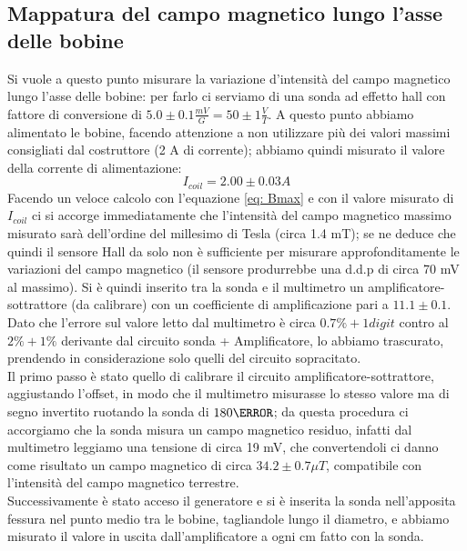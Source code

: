 \documentclass[10pt, a4paper, italian]{article}
\begin{document}
\subsection{Mappatura del campo magnetico lungo l'asse delle bobine}
Si vuole a questo punto misurare la variazione d'intensità del campo magnetico lungo l'asse delle bobine: per farlo ci serviamo di una sonda ad effetto hall con fattore di conversione di $5.0 \pm 0.1 \frac{mV}{G} = 50 \pm 1 \frac{V}{T}$.
A questo punto abbiamo alimentato le bobine, facendo attenzione a non utilizzare più dei valori massimi consigliati dal costruttore (2 A di corrente); abbiamo quindi misurato il valore della corrente di alimentazione:
\[
I_{coil}=2.00 \pm 0.03 A
\]
Facendo un veloce calcolo con l'equazione \ref{eq: Bmax} e con il valore misurato di $I_{coil}$ ci si accorge immediatamente che l'intensità del campo magnetico massimo misurato sarà dell'ordine del millesimo di Tesla (circa 1.4 mT); se ne deduce che quindi il sensore Hall da solo non è sufficiente per misurare approfonditamente le variazioni del campo magnetico (il sensore produrrebbe una d.d.p di circa 70 mV al massimo).
Si è quindi inserito tra la sonda e il multimetro un amplificatore-sottrattore (da calibrare) con un coefficiente di amplificazione pari a $11.1 \pm 0.1$.
Dato che l'errore sul valore letto dal multimetro è circa $0.7 \percent + 1 digit$ contro al $2 \percent + 1 \percent$ derivante dal circuito sonda + Amplificatore, lo abbiamo trascurato, prendendo in considerazione solo quelli del circuito sopracitato.\\
Il primo passo è stato quello di calibrare il circuito amplificatore-sottrattore, aggiustando l'offset, in modo che il multimetro misurasse lo stesso valore ma di segno invertito ruotando la sonda di $180 \degree$; da questa procedura ci accorgiamo che la sonda misura un campo magnetico residuo, infatti dal multimetro leggiamo una tensione di circa 19 mV, che convertendoli ci danno come risultato un campo magnetico di circa $34.2 \pm 0.7 \mu T$, compatibile con l'intensità del campo magnetico terrestre.\\
Successivamente è stato acceso il generatore e si è inserita la sonda nell'apposita fessura nel punto medio tra le bobine, tagliandole lungo il diametro, e abbiamo misurato il valore in uscita dall'amplificatore a ogni cm fatto con la sonda.
\begin{figure}

\end{figure}
\end{document}
